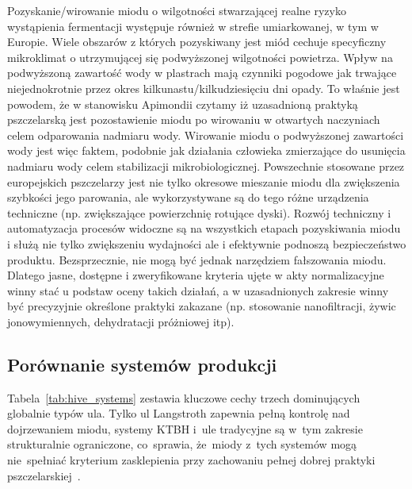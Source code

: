 Pozyskanie/wirowanie miodu o wilgotności stwarzającej realne ryzyko wystąpienia fermentacji występuje również w strefie umiarkowanej, w tym w Europie. Wiele obszarów z których pozyskiwany jest miód cechuje specyficzny mikroklimat o utrzymującej się podwyższonej wilgotności powietrza. Wpływ na podwyższoną zawartość wody w plastrach mają czynniki pogodowe jak trwające niejednokrotnie przez okres kilkunastu/kilkudziesięciu dni opady.  To właśnie jest powodem, że w stanowisku Apimondii czytamy iż  uzasadnioną praktyką pszczelarską jest pozostawienie miodu  po wirowaniu w otwartych naczyniach celem odparowania nadmiaru wody. Wirowanie miodu o podwyższonej zawartości wody jest więc faktem, podobnie jak działania człowieka zmierzające do usunięcia nadmiaru wody celem stabilizacji mikrobiologicznej. Powszechnie stosowane przez europejskich pszczelarzy jest nie tylko okresowe mieszanie miodu dla zwiększenia szybkości jego parowania, ale wykorzystywane są do tego różne urządzenia techniczne (np. zwiększające powierzchnię rotujące dyski). Rozwój techniczny i automatyzacja procesów widoczne są na wszystkich etapach pozyskiwania miodu i służą nie tylko zwiększeniu wydajności ale i efektywnie podnoszą bezpieczeństwo produktu. Bezsprzecznie, nie mogą być jednak narzędziem fałszowania miodu. Dlatego jasne, dostępne i zweryfikowane kryteria ujęte w akty normalizacyjne winny stać u podstaw oceny takich działań, a w uzasadnionych zakresie winny być precyzyjnie określone praktyki zakazane (np. stosowanie nanofiltracji, żywic jonowymiennych, dehydratacji próżniowej itp).  
\subsection{Porównanie systemów produkcji}

Tabela~\ref{tab:hive_systems} zestawia kluczowe cechy trzech
dominujących globalnie typów ula. Tylko ul Langstroth zapewnia
pełną kontrolę nad dojrzewaniem miodu, systemy KTBH
i~ule tradycyjne są w~tym zakresie strukturalnie ograniczone,
co~sprawia, że~miody z~tych systemów mogą nie~spełniać kryterium
zasklepienia przy zachowaniu pełnej dobrej praktyki
pszczelarskiej~\cite{tadele2025,sciendo2012,lrrd2013}.

